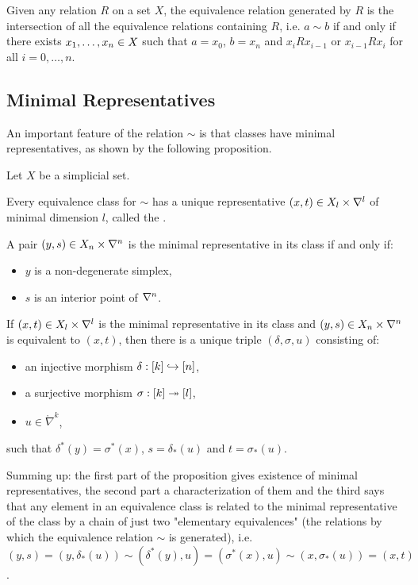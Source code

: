 \begin{remark*}
Given any relation $R$ on a set $X$, the equivalence relation generated by $R$ is the intersection of all the equivalence relations containing $R$, i.e. $a\sim b$ if and only if there exists ${x_1,\dots,x_n}\in X$ such that $a=x_0$, $b=x_n$ and $x_iRx_{i-1}$ or $x_{i-1}Rx_i$ for all $i=0,\dots,n$.
\end{remark*}

\subsection{Minimal Representatives}\label{subsection:minimal-representatives}

An important feature of the relation $\sim$ is that classes have minimal representatives, as shown by the following proposition.

\begin{proposition}\label{proposition:minimal-representatives}
Let $X$ be a simplicial set.
\begin{numerate}
\item Every equivalence class for $\sim$ has a unique representative $(x,t)\in X_l\times\nabla^{l}$ of minimal dimension $l$, called the .
\item A pair $(y,s)\in X_n\times\nabla^n$ is the minimal representative in its class if and only if:
\begin{itemize}[label={-}]
    \item $y$ is a non-degenerate simplex,
    \item $s$ is an interior point of $\nabla^n$.
\end{itemize}
\item If $(x,t)\in X_l\times\nabla^{l}$ is the minimal representative in its class and $(y,s)\in X_n\times\nabla^n$ is equivalent to $(x,t)$, then there is a unique triple $(\delta,\sigma,u)$ consisting of:
\begin{itemize}[label={-}]
    \item an injective morphism $\delta:[k]\hookrightarrow[n]$,
    \item a surjective morphism $\sigma:[k]\twoheadrightarrow[l]$,
    \item $u\in\ring\nabla^{k}$,
\end{itemize}
such that $\delta^*(y)=\sigma^*(x)$, $s=\delta_*(u)$ and $t=\sigma_*(u)$.
\end{numerate}
\end{proposition}

Summing up: the first part of the proposition gives existence of minimal representatives, the second part a characterization of them and the third says that any element in an equivalence class is related to the minimal representative of the class by a chain of just two "elementary equivalences" (the relations by which the equivalence relation $\sim$ is generated), i.e. $(y,s)=(y,\delta_*(u))\sim(\delta^*(y),u)=(\sigma^*(x),u)\sim(x,\sigma_*(u))=(x,t)$.

